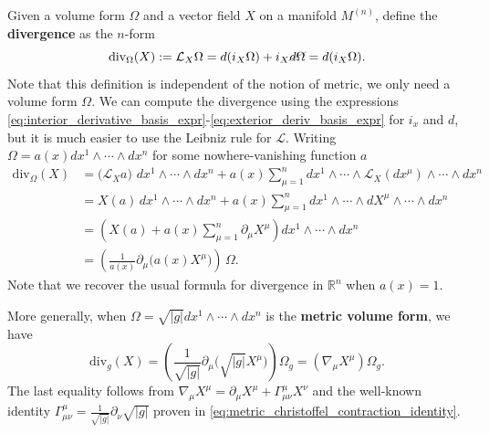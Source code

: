 \documentclass[../geometry_main.tex]{subfiles}
\begin{document}
\begin{mytheorem}
Given a volume form $\Omega$ and a vector field $X$ on a manifold $M^{(n)}$, define the \textbf{divergence} as the $n$-form
\begin{equation}
    \mathrm{div}_\Omega (X) := \mathcal{L}_X \Omega = d (i_X \Omega) + i_X \graycancel{d\Omega} = d (i_X \Omega).
\end{equation}
Note that this definition is independent of the notion of metric, we only need a volume form $\Omega$.
We can compute the divergence using the expressions \eqref{eq:interior_derivative_basis_expr}-\eqref{eq:exterior_deriv_basis_expr} for $i_x$ and $d$, but it is much easier to use the Leibniz rule for $\mathcal{L}$.
Writing $\Omega = a(x) dx^1 \wedge \cdots \wedge dx^n$ for some nowhere-vanishing function $a$
\begin{align}
    \mathrm{div}_\Omega (X) 
    &= \big(\mathcal{L}_X a\big)\,\,dx^1 \wedge \cdots \wedge dx^n + a(x) \sum_{\mu=1}^n dx^1 \wedge \cdots \wedge \mathcal{L}_X(dx^\mu) \wedge \cdots \wedge dx^n
    \\&= X(a) \, dx^1 \wedge \cdots \wedge dx^n + a(x) \sum_{\mu=1}^n dx^1 \wedge \cdots \wedge dX^{\mu} \wedge \cdots \wedge dx^n
    \\&= \left( X(a) + a(x) \sum_{\mu=1}^n \partial_{\mu} X^{\mu} \right) dx^1 \wedge \cdots \wedge dx^n 
    \\&= \left( \frac{1}{a(x)} \partial_{\mu} \big(a(x) X^{\mu}\big) \right) \, \Omega.
\end{align}
Note that we recover the usual formula for divergence in $\mathbb{R}^n$ when $a(x) = 1$.
\smallskip

More generally, when $\Omega = \sqrt{|g|} dx^1 \wedge \cdots \wedge dx^n$ is the \textbf{metric volume form}, we have
\begin{equation}
    \mathrm{div}_g (X) = \left( \frac{1}{\sqrt{|g|}} \partial_{\mu} \Big(\sqrt{|g|} X^{\mu}\Big) \right) \Omega_g = \left( \nabla_{\mu} X^{\mu} \right) \Omega_g.
\end{equation}
The last equality follows from $\nabla_{\mu}X^\mu= \partial_\mu X^\mu + \Gamma_{\mu \nu}^\mu X^\nu$ and the well-known identity $\Gamma_{\mu \nu}^\mu = \frac{1}{\sqrt{|g|}} \partial_\nu \sqrt{|g|}$ proven in \eqref{eq:metric_christoffel_contraction_identity}.
\smallskip


\end{mytheorem}
\end{document}
